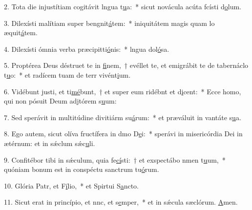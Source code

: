 2. Tota die injustítiam cogitávit lngua t\uline{u}a:~* sicut novácula acúta fcísti d\uline{o}lum.\par 
3. Dilexísti malítiam super bengnit\uline{á}tem:~* iniquitátem magis quam lo æquit\uline{á}tem.\par 
4. Dilexísti ómnia verba præcipitti\uline{ó}nis:~* lngua dol\uline{ó}sa.\par 
5. Proptérea Deus déstruet te in \uline{fi}nem,~† evéllet te, et emigrábit te de tabernáclo t\uline{u}o:~* et radícem tuam de terr vivént\uline{i}um.\par 
6. Vidébunt justi, et ti\uline{mé}bunt,~† et super eum ridébnt et d\uline{i}cent:~* Ecce homo, qui non pósuit Deum adjtórem s\uline{u}um:\par 
7. Sed sperávit in multitúdine divitiárm su\uline{á}rum:~* et præváluit in vantáte s\uline{u}a.\par 
8. Ego autem, sicut olíva fructífera in dmo D\uline{e}i:~* sperávi in misericórdia Dei in ætérnum: et in sǽclum sǽc\uline{u}li.\par 
9. Confitébor tibi in sǽculum, quia fe\uline{cí}sti:~† et exspectábo nmen t\uline{u}um,~* quóniam bonum est in conspéctu sanctrum tu\uline{ó}rum.\par 
10. Glória Patr, et F\uline{í}lio,~* et Spirtui S\uline{a}ncto.\par 
11. Sicut erat in princípio, et nnc, et s\uline{e}mper,~* et in sǽcula sæclórum. \uline{A}men.\par 
